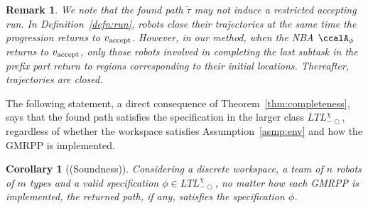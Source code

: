 \documentclass[Afour,sageh,times]{sagej}
\makeatletter
\newtheorem{cor}[thm]{Corollary}
\newtheorem{rem}[thm]{Remark}
\newcommand{\autop}{\ccalA_{\phi}}
\newcommand{\vertex}[1]{v_{\textup{#1}}}
\newcommand{\scriptveryshortarrow}[1][3pt]{{%
    \hbox{\rule[\scriptratio\dimexpr\fontdimen22\textfont2-.2pt\relax]
               {\scriptratio\dimexpr#1\relax}{\scriptratio\dimexpr.4pt\relax}}%
   \mkern-4mu\hbox{\let\f@size\sf@size\usefont{U}{lasy}{m}{n}\symbol{41}}}}
\makeatother
\begin{document}
{{\begin{rem}
  We note that the found path $\tilde{\tau}$ may not induce a restricted accepting run. In Definition~\ref{defn:run}, robots close  their trajectories at the same time the progression returns  to $\vertex{accept}$. However, in our  method, when the NBA $\autop$ returns to $\vertex{accept}$, only those robots involved in completing the last subtask in the prefix part return to regions corresponding to their initial locations. Thereafter,  trajectories are closed.
\end{rem}

The following statement, a direct consequence of Theorem~\ref{thm:completeness}, says that the found path satisfies the specification in the larger class $\textit{LTL}_{-\bigcirc}^\chi$, regardless of whether the workspace satisfies Assumption~\ref{asmp:env} and how the GMRPP is implemented.
\begin{cor}[(Soundness)]\label{thm:soundness}
  Considering  a discrete workspace, a team of $n$ robots of $m$ types and a valid specification $\phi\in \textit{LTL}_{-\bigcirc}^\chi$,  no matter how each GMRPP is implemented, the returned path, if any, satisfies the specification $\phi$.
\end{cor}

}}
\end{document}

